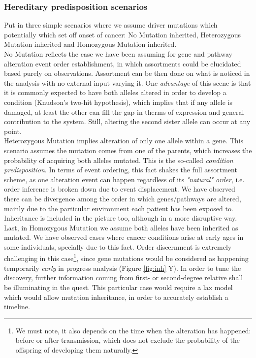 \subsubsection{Hereditary predisposition scenarios}
Put in three simple scenarios where we assume driver mutations which potentially which set off onset of cancer: No Mutation inherited, Heterozygous Mutation inherited and Homozygous Mutation inherited. 
\\

No Mutation reflects the case we have been assuming for gene and pathway alteration event order establishment, in which assortments could be elucidated based purely on observations. Assortment can be then done on what is noticed in the analysis with no external input varying it.
One \emph{advantage} of this scene is that it is commonly expected to have both alleles altered in order to develop a condition (Knudson’s two-hit hypothesis), which implies that if any allele is damaged, at least the other can fill the gap in therms of expression and general contribution to the system. Still, altering the second sister allele can occur at any point.
\\

Heterozygous Mutation implies alteration of only one allele within a gene. This scenario assumes the mutation comes from one of the parents, which increases the probability of acquiring both alleles mutated. This is the so-called \emph{condition predisposition}. In terms of event ordering, this fact shakes the full assortment scheme, as one alteration event can happen regardless of its \emph{"natural" order}, i.e. order inference is broken down due to event displacement. We have observed there can be divergence among the order in which genes/pathways are altered, mainly due to the particular environment each patient has been exposed to. Inheritance is included in the picture too, although in a more disruptive way.
\\

Last, in Homozygous Mutation we assume both alleles have been inherited as mutated. We have observed cases where cancer conditions arise at early ages in some individuals, specially due to this fact. Order discernment is extremely challenging in this case\footnote{We must note, it also depends on the time when the alteration has happened: before or after transmission, which does not exclude the probability of the offspring of developing them naturally.}, since gene mutations would be considered as happening temporarily \emph{early} in progress analysis (Figure \ref{fig:inh} Y). 
In order to tune the discovery, further information coming from first- or second-degree relative shall be illuminating in the quest. This particular case would require a lax model which would allow mutation inheritance, in order to accurately establish a timeline.
\\

